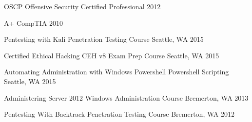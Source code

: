 



\begin{cvhonors}


\cvhonor
{OSCP} %
{Offensive Security Certified Professional} %
{} %
{2012} %

\cvhonor
{A+} %
{CompTIA} %
{} %
{2010} %

\end{cvhonors}



\begin{cvhonors}


\cvhonor
{Pentesting with Kali} %
{Penetration Testing Course} %
{Seattle, WA} %
{2015} %

\cvhonor
{Certified Ethical Hacking} %
{CEH v8 Exam Prep Course} %
{Seattle, WA} %
{2015} %

\cvhonor
{Automating Administration with Windows Powershell} %
{Powershell Scripting} %
{Seattle, WA} %
{2015} %

\cvhonor
{Administering Server 2012} %
{Windows Administration Course} %
{Bremerton, WA} %
{2013} %

\cvhonor
{Pentesting With Backtrack} %
{Penetration Testing Course} %
{Bremerton, WA} %
{2012} %





\end{cvhonors}
